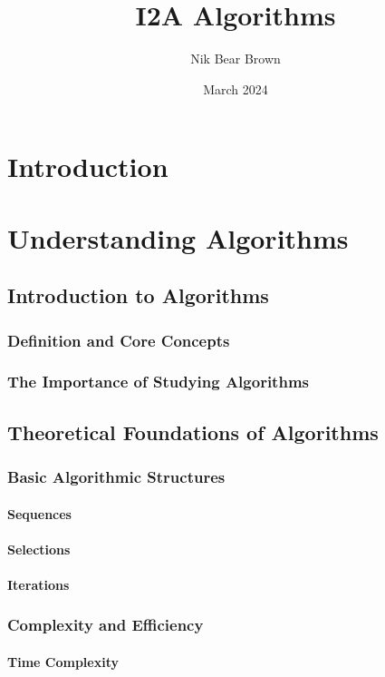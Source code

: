 \documentclass[12pt]{book} %
\title{I2A Algorithms}
\author{Nik Bear Brown}
\date{March 2024}
\begin{document}
\frontmatter
\maketitle
\tableofcontents

\mainmatter
\chapter{Introduction} 

\chapter{Understanding Algorithms}

\section{Introduction to Algorithms}
\subsection{Definition and Core Concepts}
\subsection{The Importance of Studying Algorithms}

\section{Theoretical Foundations of Algorithms}
\subsection{Basic Algorithmic Structures}
\subsubsection{Sequences}
\subsubsection{Selections}
\subsubsection{Iterations}
\subsection{Complexity and Efficiency}
\subsubsection{Time Complexity}
\end{document}
